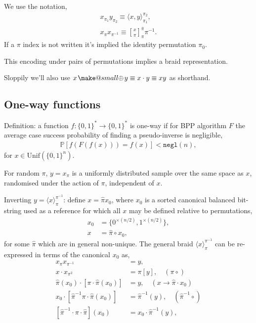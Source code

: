 \documentclass[twocolumn, aps, amsmath, amssymb, nofootinbib, superscriptaddress, longbibliography, doublefloatfix, table-of-contents, eqsecnum, rmp]{revtex4-2}
\makeatletter
\def\braid#1#2#3#4{\langle#1,#2\rangle_{#3}^{#4}}
\def\symbraid#1{\langle#1\rangle_{\pi}^{\pi^{-1}}}
\newcommand{\stackbraid}[2]{{\genfrac{[}{]}{0pt}{}{{#1}}{{#2}}}^{\bar{\pi}}_{\pi}}
\newcommand{\soplus}{{{\hspace{1pt}}{\mathbin{\mathpalette\make@small{\mathbin\oplus}}}}{\hspace{1pt}}}
\newcommand{\make@small}[2]{%
  \vcenter{\hbox{%
    \scalebox{0.6}{$\m@th#1#2$}%
  }}%
}
\makeatother
\begin{document}
We use the notation,
\begin{align}
	x_{\pi_1} y_{\pi_2} \equiv \braid{x}{y}{\pi_1}{\pi_2},\nonumber\\
	x_{\pi} x_{\pi^{-1}} \equiv \stackbraid{x}{\pi}{\pi^{-1}}.
\end{align}
If a $\pi$ index is not written it's implied the identity permutation $\pi_0$.

This encoding under pairs of permutations implies a braid representation.

Sloppily we'll also use $x\soplus y \equiv x \cdot y \equiv xy$ as shorthand.

\subsection{One-way functions}

Definition: a function $f:\{0,1\}^* \to \{0,1\}^*$ is one-way if for BPP algorithm $F$ the average case success probability of finding a pseudo-inverse is negligible,
\begin{align}
	\mathbb{P}[f(F(f(x))) = f(x)] < \mathtt{negl}(n),
\end{align}
for $x\in\mathrm{Unif}(\{0,1\}^n)$.

For random $\pi$, $y=x_\pi$ is a uniformly distributed sample over the same space as $x$, randomised under the action of $\pi$, independent of $x$.

Inverting $y=\symbraid{x}$: define $x = \hat\pi x_0$, where $x_0$ is a sorted canonical balanced bit-string used as a reference for which all $x$ may be defined relative to permutations,
\begin{align}
	x_0 &= \{0^{\times(n/2)},1^{\times(n/2)}\},\nonumber\\
	x &= \hat\pi \circ x_0,
\end{align}
for some $\hat\pi$ which are in general non-unique. The general braid $\symbraid{x}$ can be re-expressed in terms of the canonical $x_0$ as,
\begin{align}
	x_\pi x_{\pi^{-1}} &= y,\nonumber\\
	x \cdot x_{\pi^2} &= \pi[y],\quad (\pi\circ)\nonumber\\
	\hat\pi(x_0) \cdot [\pi \cdot \hat\pi (x_0)] &= y,\quad (x\to \hat\pi \cdot x_0)\nonumber\\
	x_0 \cdot [\hat\pi^{-1} \pi \cdot \hat\pi (x_0)] &= \hat\pi^{-1}(y),\quad (\hat\pi^{-1}\circ)\nonumber\\
	[\hat\pi^{-1}\cdot \pi \cdot \hat\pi](x_0) &= x_0 \cdot \hat\pi^{-1}(y),\nonumber\\
\end{align}
\end{document}
